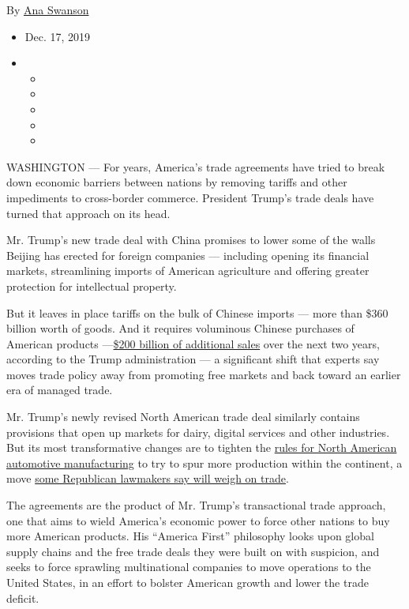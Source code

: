 By \href{https://www.nytimes3xbfgragh.onion/by/ana-swanson}{Ana Swanson}

\begin{itemize}
\item
  Dec. 17, 2019
\item
  \begin{itemize}
  \item
  \item
  \item
  \item
  \item
  \end{itemize}
\end{itemize}

WASHINGTON --- For years, America's trade agreements have tried to break
down economic barriers between nations by removing tariffs and other
impediments to cross-border commerce. President Trump's trade deals have
turned that approach on its head.

Mr. Trump's new trade deal with China promises to lower some of the
walls Beijing has erected for foreign companies --- including opening
its financial markets, streamlining imports of American agriculture and
offering greater protection for intellectual property.

But it leaves in place tariffs on the bulk of Chinese imports --- more
than \$360 billion worth of goods. And it requires voluminous Chinese
purchases of American products
---\href{https://www.nytimes3xbfgragh.onion/2019/12/13/business/economy/china-trade-deal.html}{\$200
billion of additional sales} over the next two years, according to the
Trump administration --- a significant shift that experts say moves
trade policy away from promoting free markets and back toward an earlier
era of managed trade.

Mr. Trump's newly revised North American trade deal similarly contains
provisions that open up markets for dairy, digital services and other
industries. But its most transformative changes are to tighten the
\href{https://www.nytimes3xbfgragh.onion/2019/12/11/business/nafta-usmca-auto-jobs.html}{rules
for North American automotive manufacturing} to try to spur more
production within the continent, a move
\href{https://www.nytimes3xbfgragh.onion/2019/12/01/us/politics/trump-trade-deal-usmca.html}{some
Republican lawmakers say will weigh on trade}.

The agreements are the product of Mr. Trump's transactional trade
approach, one that aims to wield America's economic power to force other
nations to buy more American products. His ``America First'' philosophy
looks upon global supply chains and the free trade deals they were built
on with suspicion, and seeks to force sprawling multinational companies
to move operations to the United States, in an effort to bolster
American growth and lower the trade deficit.

